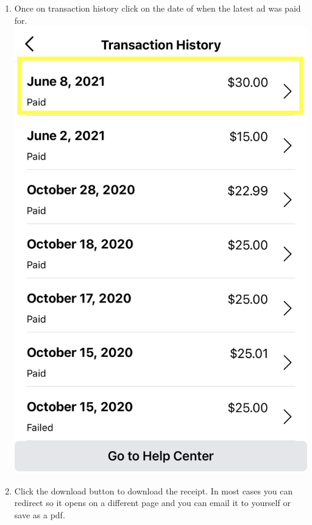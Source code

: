 \documentclass[]{book}
\begin{document}
\begin{enumerate}
\def\labelenumi{\arabic{enumi}.}
\setcounter{enumi}{4}
\item
  Once on transaction history click on the date of when the latest ad was paid for.
  \includegraphics{images/lab_protocols/ig_pay/ig_5.png}
\item
  Click the download button to download the receipt. In most cases you can redirect so it opens on a different page and you can email it to yourself or save as a pdf.

\end{enumerate}
\end{document}
